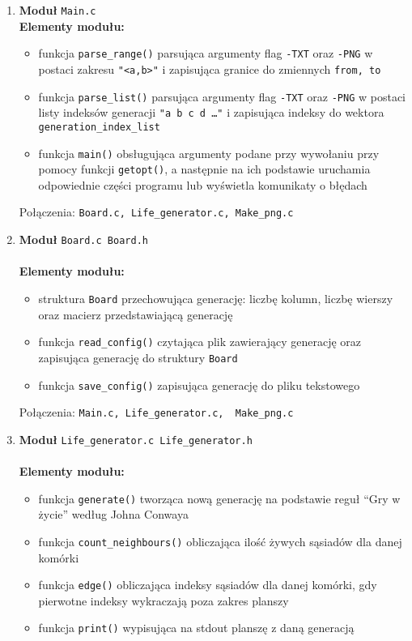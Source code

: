 \documentclass[12pt,a4paper,notitlepage]{report}
\begin{document}
\begin{enumerate} 
\item\textbf{Moduł} \verb|Main.c|\\

\textbf{Elementy modułu:}\\
\begin{itemize}
\item funkcja \verb|parse_range()| parsująca argumenty flag \verb|-TXT| oraz \verb|-PNG| w postaci zakresu \verb|"<a,b>"| i zapisująca granice do zmiennych \verb|from, to|

\item funkcja \verb|parse_list()| parsująca argumenty flag \verb|-TXT| oraz \verb|-PNG| w postaci listy indeksów generacji \verb|"a b c d …"| i zapisująca indeksy do wektora \verb|generation_index_list|

\item funkcja \verb|main()| obsługująca argumenty podane przy wywołaniu przy pomocy funkcji \verb|getopt()|, a następnie na ich podstawie uruchamia odpowiednie części programu lub wyświetla komunikaty o błędach

\end{itemize}

Połączenia: \verb|Board.c, Life_generator.c, Make_png.c|\\

\item\textbf{Moduł} \verb|Board.c Board.h|\\
\\
\textbf{Elementy modułu:}
\begin{itemize}
\item struktura \verb|Board| przechowująca generację: liczbę kolumn, liczbę wierszy oraz macierz przedstawiającą generację
\item funkcja \verb|read_config()| czytająca plik zawierający generację oraz zapisująca generację do struktury \verb|Board|
\item funkcja \verb|save_config()| zapisująca generację do pliku tekstowego
\end{itemize}
Połączenia: \verb|Main.c, Life_generator.c,  Make_png.c|\\

\item\textbf{Moduł} \verb|Life_generator.c Life_generator.h|\\
\\
\textbf{Elementy modułu:}
\begin{itemize}
\item funkcja \verb|generate()| tworząca nową generację na podstawie reguł “Gry w życie” według Johna Conwaya
\item funkcja \verb|count_neighbours()| obliczająca ilość żywych sąsiadów dla danej komórki
\item funkcja \verb|edge()| obliczająca indeksy sąsiadów dla danej komórki, gdy pierwotne indeksy wykraczają poza zakres planszy
\item funkcja \verb|print()| wypisująca na stdout planszę z daną generacją
\end{itemize}


\end{enumerate}
\end{document}
